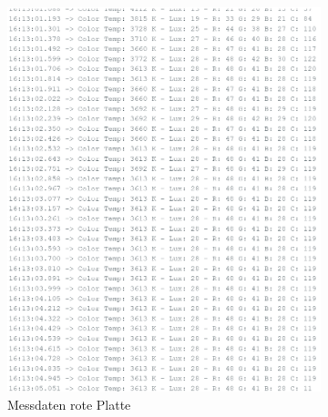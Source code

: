 \begin{figure}[H]
    \begin{subfigure}{0.35\textwidth}
        \centering
        \includegraphics[width=\linewidth]{img/sensortest/MD_RotePlatte_101ms.png}
        \caption{Messdaten rote Platte}
        \label{fig:MDFarbsensorPlatte}
    \end{subfigure}
    \begin{subfigure}{0.35\textwidth}
        \centering

\end{subfigure}
\end{figure}

